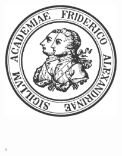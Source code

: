 
\begin{titlepage}
    \begin{addmargin}[-1cm]{-3cm}
    \begin{center}
        \large  

        \hfill

        \vfill

        \begingroup
            \color{Maroon}\spacedallcaps{\myTitle} \\
            \color{MidnightBlue}\spacedlowsmallcaps{\mySubtitle}\\ \bigskip
        \endgroup

        \spacedlowsmallcaps{\myName}

        \vfill
        \vfill

        \includegraphics[width=5cm]{gfx/fau-siegel_grau} \\ \medskip
        \medskip   
        \medskip   

        \medskip   
        \color{SiegelGrau}\myDepartment \\                            
        \color{SiegelGrau}\myUni, \myLocation \\ \bigskip

        \color{SiegelGrau}\myTime\


    \end{center}  
  \end{addmargin}       
\end{titlepage}   
